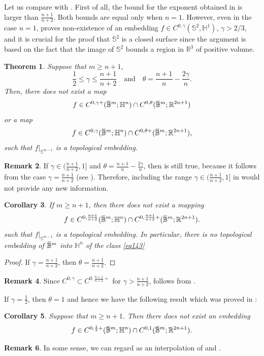 \documentclass[intlimits,12pt,reqno]{amsart}
\newcommand{\Sph}{\mathbb S}
\newcommand{\bbbr}{\mathbb R}
\newcommand{\bbbb}{\mathbb B}
\newcommand{\bbbh}{\mathbb H}
\newcommand{\R}{\mathbb R}
\newcommand{\overbar}[1]{\mkern 1.7mu\overline{\mkern-1.7mu#1\mkern-1.5mu}\mkern 1.5mu}
\numberwithin{equation}{section}
\newtheorem{theorem}{Theorem}[section]
\newtheorem{corollary}[theorem]{Corollary}
\theoremstyle{definition}
\newtheorem{remark}[theorem]{Remark}
\begin{document}
Let us compare  with . First of all, the bound for the exponent obtained in  is larger than $\frac{n+1}{n+2}$. Both bounds are equal only when $n=1$. However, even in the case $n=1$,  proves non-existence of an embedding $f\in C^{0,\gamma}(\Sph^2,\bbbh^1)$, $\gamma>2/3$, and it is crucial for the proof that $\Sph^2$ is a closed surface since the argument is based on the fact that the image of $\Sph^2$
bounds a region in $\R^3$ of positive volume. 
\begin{theorem}
\label{T53}
Suppose that $m\geq n+1$,
$$
\frac{1}{2}\leq\gamma\leq\frac{n+1}{n+2}
\quad
\text{and}
\quad
\theta=\frac{n+1}{n}-\frac{2\gamma}{n}.
$$
Then, there does not exist a map
$$
f\in C^{0,\gamma+}(\overbar{\bbbb}^m;\bbbh^n)\cap C^{0,\theta}(\overbar{\bbbb}^m;\R^{2n+1})
$$
or a map
$$
f\in C^{0,\gamma}(\overbar{\bbbb}^m;\bbbh^n)\cap C^{0,\theta+}(\overbar{\bbbb}^m;\R^{2n+1}),
$$
such that $f|_{\Sph^{m-1}}$ is a topological embedding. 
\end{theorem}
\begin{remark}
If $\gamma\in (\frac{n+1}{n+2},1]$ and $\theta=\frac{n+1}{n}-\frac{2\gamma}{n}$, then  is still true, because it follows from the case $\gamma=\frac{n+1}{n+2}$ (see ). Therefore, including the range $\gamma\in(\frac{n+1}{n+2},1]$ in  would not provide any new information.
\end{remark}
\begin{corollary}
\label{T97}
If $m\geq n+1$, then there does not exist a mapping
\begin{equation}
\label{eq143}
f\in C^{0,\frac{n+1}{n+2}}(\overbar{\bbbb}^m;\bbbh^n)\cap C^{0,\frac{n+1}{n+2}+}(\overbar{\bbbb}^m;\R^{2n+1}).
\end{equation}
such that $f|_{\Sph^{m-1}}$ is a topological embedding. In particular, there is no topological embedding of $\overbar{\bbbb}^m$ into $\bbbh^n$ of the class \eqref{eq143}
\end{corollary}
\begin{proof}
If $\gamma=\frac{n+1}{n+2}$, then $\theta=\frac{n+1}{n+2}$.
\end{proof}
\begin{remark}
Since $C^{0,\gamma}\subset C^{0,\frac{n+1}{n+2}+}$ for $\gamma>\frac{n+1}{n+2}$,  follows from .
\end{remark}
If $\gamma=\frac{1}{2}$, then $\theta=1$ and hence we have the following result which was proved in 
\cite[Theorem~1.11]{BHW}:
\begin{corollary}
\label{T95}
Suppose that $m\geq n+1$. Then there does not exist an embedding
$$
f\in C^{0,\frac{1}{2}+}(\overbar{\bbbb}^m;\bbbh^n)\cap C^{0,1}(\overbar{\bbbb}^m;\bbbr^{2n+1}).
$$
\end{corollary}
\begin{remark}
In some sense, we can regard  as an interpolation of  and .
\end{remark}
\end{document}
